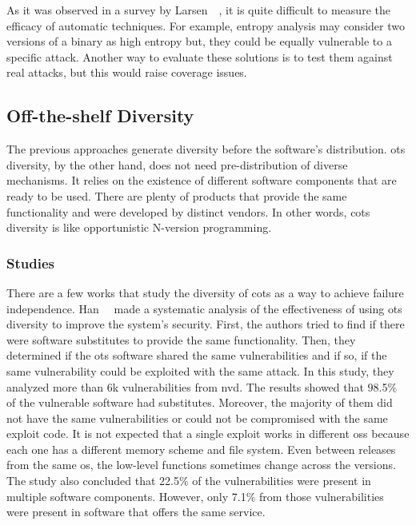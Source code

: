 As it was observed in a survey by Larsen~\etal{}~\cite{Larsen:2015}, it is quite difficult to measure the efficacy of automatic techniques.
For example, entropy analysis may consider two versions of a binary as high entropy but, they could be equally vulnerable to a specific attack.
Another way to evaluate these solutions is to test them against real attacks, but this would raise coverage issues.


\subsection{Off-the-shelf Diversity}
The previous approaches generate diversity before the software’s distribution. 
\gls{ots} diversity, by the other hand, does not need pre-distribution of diverse mechanisms. 
It relies on the existence of different software components that are ready to be used.
There are plenty of products that provide the same functionality and were developed by distinct vendors. 
In other words, \gls{cots} diversity is like opportunistic N-version programming.


\subsubsection{Studies}
There are a few works that study the diversity of \gls{cots} as a way to achieve failure independence.
Han~\etal{}~\cite{Han:2009} made a systematic analysis of the effectiveness of using \gls{ots} diversity to improve the system's security.
First, the authors tried to find if there were software substitutes to provide the same functionality. 
Then, they determined if the \gls{ots} software shared the same vulnerabilities and if so, if the same vulnerability could be exploited with the same attack. 
In this study, they analyzed more than 6k vulnerabilities from \gls{nvd}. 
The results showed that 98.5$\%$ of the vulnerable software had substitutes. 
Moreover, the majority of them did not have the same vulnerabilities or could not be compromised with the same exploit code. 
It is not expected that a single exploit works in different \glspl{os} because each one has a different memory scheme and file system. 
Even between releases from the same \gls{os}, the low-level functions sometimes change across the versions. 
The study also concluded that 22.5$\%$ of the vulnerabilities were present in multiple software components. 
However, only 7.1$\%$ from those vulnerabilities were present in software that offers the same service. 

